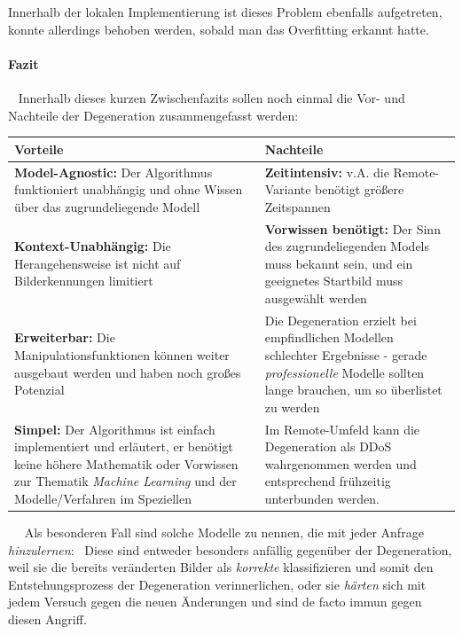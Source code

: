 Innerhalb der lokalen Implementierung ist dieses Problem ebenfalls aufgetreten, konnte allerdings behoben werden, sobald man das Overfitting erkannt hatte.
\paragraph{Fazit} ~\newline
Innerhalb dieses kurzen Zwischenfazits sollen noch einmal die Vor- und Nachteile der Degeneration zusammengefasst werden: ~\newline ~\newline  
\begin{tabular}{|p{7.5cm}|p{7.5cm}|}
	\hline 
	\textbf{Vorteile} & \textbf{Nachteile} \\ 
	\hline 
	\textbf{Model-Agnostic:} \newline Der Algorithmus funktioniert unabhängig und ohne Wissen über das zugrundeliegende Modell & \textbf{Zeitintensiv:} \newline v.A. die Remote-Variante benötigt größere Zeitspannen \\ 
	\hline 
	\textbf{Kontext-Unabhängig:} \newline Die Herangehensweise ist nicht auf Bilderkennungen limitiert & \textbf{Vorwissen benötigt:} \newline Der Sinn des zugrundeliegenden Models muss bekannt sein, und ein geeignetes Startbild muss ausgewählt werden  \\ 
	\hline 
	\textbf{Erweiterbar:} \newline Die Manipulationsfunktionen können weiter ausgebaut werden und haben noch großes Potenzial & Die Degeneration erzielt bei empfindlichen Modellen schlechter Ergebnisse - gerade \textit{professionelle} Modelle sollten lange brauchen, um so überlistet zu werden \\ 
	\hline 
	\textbf{Simpel:} \newline Der Algorithmus ist einfach implementiert und erläutert, er benötigt keine höhere Mathematik oder Vorwissen zur Thematik \textit{Machine Learning} und der Modelle/Verfahren im Speziellen & Im Remote-Umfeld kann die Degeneration als DDoS wahrgenommen werden und entsprechend frühzeitig unterbunden werden. \\ 
	\hline 
\end{tabular}  ~\newline ~\newline
Als besonderen Fall sind solche Modelle zu nennen, die mit jeder Anfrage \textit{hinzulernen}: ~\newline Diese sind entweder besonders anfällig gegenüber der Degeneration, weil sie die bereits veränderten Bilder als \textit{korrekte} klassifizieren und somit den Entstehungsprozess der Degeneration verinnerlichen, oder sie \textit{härten} sich mit jedem Versuch gegen die neuen Änderungen und sind de facto immun gegen diesen Angriff.  

